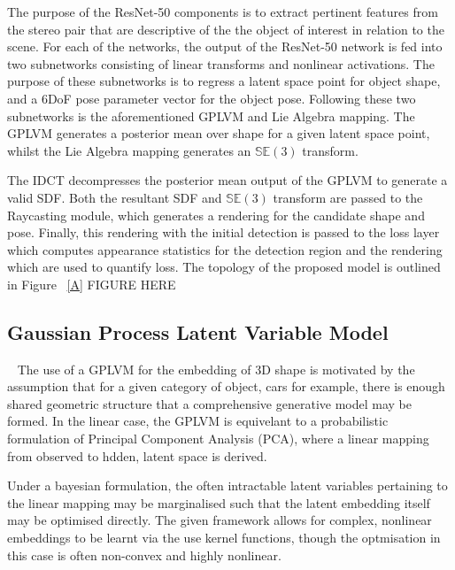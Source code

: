 The purpose of the ResNet-50 components is to extract pertinent features from the stereo 
pair that are descriptive of the the object of interest in relation to the scene. For each 
of the networks, the output of the ResNet-50 network is fed into two subnetworks consisting 
of linear transforms and nonlinear activations. The purpose of these subnetworks is to regress 
a latent space point for object shape, and a 6DoF pose parameter vector for the object pose. 
Following these two subnetworks is the aforementioned GPLVM and Lie Algebra mapping. The 
GPLVM generates a posterior mean over shape for a given latent space point, whilst the 
Lie Algebra mapping generates an \( \mathbb{SE}(3) \) transform. 

The IDCT decompresses the posterior mean output of the GPLVM to generate a valid SDF\@. Both the 
resultant SDF and \( \mathbb{SE}(3) \) transform are passed to the Raycasting module, which generates 
a rendering for the candidate shape and pose. Finally, this rendering with the initial detection is passed 
to the loss layer which computes appearance statistics for the detection region and the rendering 
which are used to quantify loss. The topology of the proposed model is outlined in Figure
~\ref{A}
FIGURE HERE

\subsection{Gaussian Process Latent Variable Model}
~\label{subsec:spp_gplvm}
The use of a GPLVM for the embedding of 3D shape is motivated by the assumption that for a 
given category of object, cars for example, there is enough shared geometric structure that 
a comprehensive generative model may be formed. In the linear case, the GPLVM is equivelant 
to a probabilistic formulation of Principal Component Analysis (PCA), where a linear mapping 
from observed to hdden, latent space is derived. 

Under a bayesian formulation, the often intractable latent variables pertaining to the linear 
mapping may be marginalised such that the latent embedding itself may be optimised directly. The 
given framework allows for complex, nonlinear embeddings to be learnt via the use kernel functions, 
though the optmisation in this case is often non-convex and highly nonlinear.

